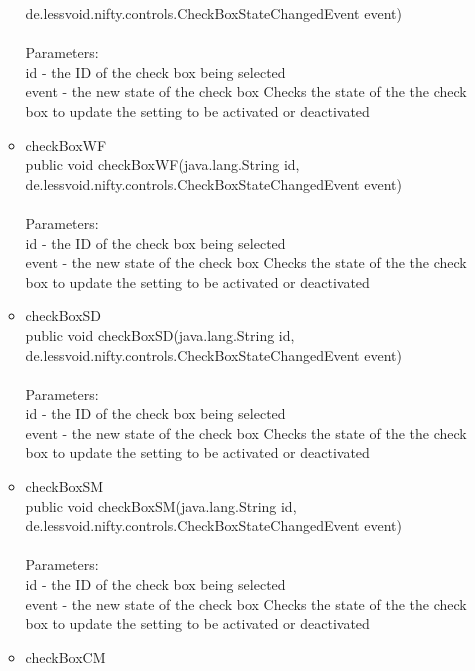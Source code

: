 \documentclass[letterpaper]{article}
\begin{document}
\begin{itemize}
\begin{itemize}
				            de.lessvoid.nifty.controls.CheckBoxStateChangedEvent event) \\ \\
													Parameters: \\
													id - the ID of the check box being selected \\
													event - the new state of the check box Checks the state of the the check box to update the setting to be activated or deactivated
											\item	checkBoxWF \\
													public void checkBoxWF(java.lang.String id, \\
				              de.lessvoid.nifty.controls.CheckBoxStateChangedEvent event) \\ \\
													Parameters: \\
													id - the ID of the check box being selected \\
													event - the new state of the check box Checks the state of the the check box to update the setting to be activated or deactivated
											\item	checkBoxSD \\
													public void checkBoxSD(java.lang.String id, \\
				              de.lessvoid.nifty.controls.CheckBoxStateChangedEvent event) \\ \\
													Parameters: \\
													id - the ID of the check box being selected \\
													event - the new state of the check box Checks the state of the the check box to update the setting to be activated or deactivated
											\item	checkBoxSM \\
													public void checkBoxSM(java.lang.String id, \\
				              de.lessvoid.nifty.controls.CheckBoxStateChangedEvent event) \\ \\
													Parameters: \\
													id - the ID of the check box being selected \\
													event - the new state of the check box Checks the state of the the check box to update the setting to be activated or deactivated
											\item	checkBoxCM \\

\end{itemize}
\end{itemize}
\end{document}
